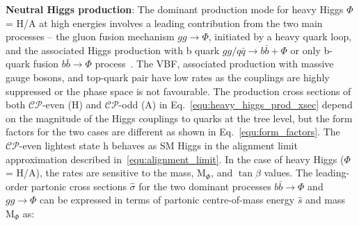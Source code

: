 \noindent \textbf{Neutral Higgs production}:\label{neutral_higgs_prod} 
The dominant production mode for heavy Higgs $\Phi$ = H/A at high energies involves a leading contribution from the two main processes – the gluon fusion mechanism $gg\rightarrow \Phi$, initiated by a heavy quark loop, and the associated Higgs production with b quark $gg/q\bar{q}\rightarrow b\bar{b} + \Phi$ or only b-quark fusion $b\bar{b}\rightarrow \Phi$ process~\cite{Djouadi:2015jea}. The VBF, associated production with massive gauge bosons, and top-quark pair have low rates as the couplings are highly suppressed or the phase space is not favourable. The production cross sections of both $\mathcal{CP}$-even (H) and $\mathcal{CP}$-odd (A) in Eq.~\ref{equ:heavy_higgs_prod_xsec} depend on the magnitude of the Higgs couplings to quarks at the tree level, but the form factors for the two cases are different as shown in Eq.~\ref{equ:form_factors}. The $\mathcal{CP}$-even lightest state h behaves as SM Higgs in the alignment limit approximation described in~\ref{equ:alignment_limit}. In the case of heavy Higgs ($\Phi$ = H/A), the rates are sensitive to the mass, M$_{\Phi}$, and $\tan\beta$ values. The leading-order partonic cross sections $\hat{\sigma}$ for the two dominant processes $b\bar{b}\rightarrow\Phi$ and $gg\rightarrow\Phi$ can be expressed in terms of partonic centre-of-mass energy $\hat{s}$ and mass M$_{\Phi}$ as:

